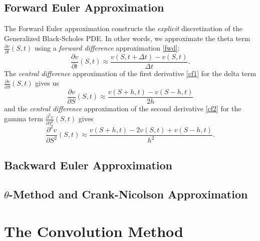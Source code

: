 \subsection*{Forward Euler Approximation}
The Forward Euler approximation constructs the \textit{explicit} discretization of the Generalized Black-Scholes PDE. In other words, we approximate the theta term $\frac{\partial v}{\partial t}(S,t)$ using a \textit{forward difference} approximation \eqref{fwd}:
$$\frac{\partial v}{\partial t}(S,t) \approx \frac{v(S,t+\Delta t)-v(S,t)}{\Delta t}.$$
The \textit{central difference} approximation of the first derivative \eqref{cf1} for the delta term $\frac{\partial v}{\partial S}(S,t)$ gives us
$$\frac{\partial v}{\partial S}(S,t) \approx \frac{v(S+h,t)-v(S-h,t)}{2h}$$
and the \textit{central difference} approximation of the second derivative \eqref{cf2} for the gamma term $\frac{\partial^2 v}{\partial S^2}(S,t)$ gives
$$\frac{\partial^2 v}{\partial S^2}(S,t) \approx \frac{v(S+h,t)-2 v(S,t)+v(S-h,t)}{h^2}.$$

\subsection*{Backward Euler Approximation}

\subsection*{$\theta$-Method and Crank-Nicolson Approximation}

\section{The Convolution Method}
\label{sec:methods:conv}
